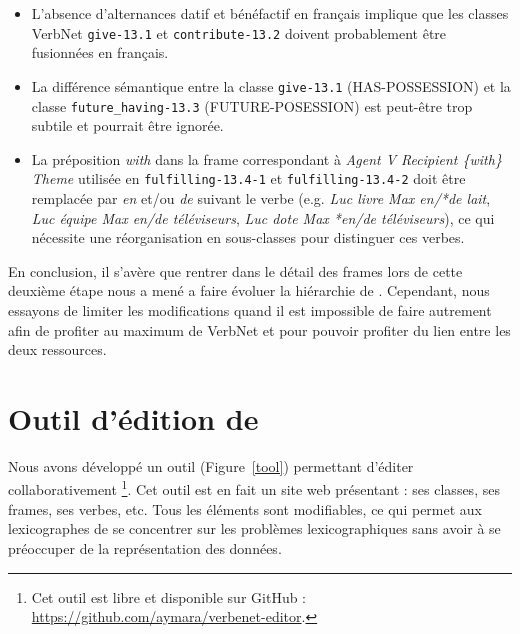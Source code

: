 \begin{itemize}
    \item L'absence d'alternances datif et bénéfactif en français implique que
        les classes VerbNet {\color{blue}\texttt{give-13.1}} et
        {\color{blue}\texttt{contribute-13.2}} doivent probablement être fusionnées en
        français.
    \item La différence sémantique entre la classe
        {\color{blue}\texttt{give-13.1}} (HAS-POSSESSION) et la classe
        {\color{blue}\texttt{future\_having-13.3}} (FUTURE-POSESSION) est
        peut-être trop subtile et pourrait être ignorée.
    \item La préposition \textit{with} dans la frame correspondant à \textit{Agent
        V Recipient \{with\} Theme} utilisée en
        {\color{blue}\texttt{fulfilling-13.4-1}} et
        {\color{blue}\texttt{fulfilling-13.4-2}} doit être remplacée par
        \textit{en} et/ou \textit{de} suivant le verbe (e.g. \textit{Luc livre Max
        en/*de lait}, \textit{Luc équipe Max en/de téléviseurs}, \textit{Luc dote
        Max *en/de téléviseurs}), ce qui nécessite une réorganisation en
        sous-classes pour distinguer ces verbes.
\end{itemize}

En conclusion, il s'avère que rentrer dans le détail des frames lors de cette
deuxième étape nous a mené a faire évoluer la hiérarchie de \verbenet{}.
Cependant, nous essayons de limiter les modifications quand il est impossible
de faire autrement afin de profiter au maximum de VerbNet et pour pouvoir
profiter du lien entre les deux ressources.

\section{Outil d'édition de \verbenet{}}\label{toolquentin}

Nous avons développé un outil (Figure~\ref{tool}) permettant d'éditer collaborativement
\verbenet{}\footnote{Cet outil est libre et disponible sur GitHub :
\url{https://github.com/aymara/verbenet-editor}.}. Cet outil est en fait un
site web présentant \verbenet{}: ses classes, ses frames, ses verbes, etc.
Tous les éléments sont modifiables, ce qui permet aux lexicographes de se
concentrer sur les problèmes lexicographiques sans avoir à se préoccuper de la
représentation des données.

